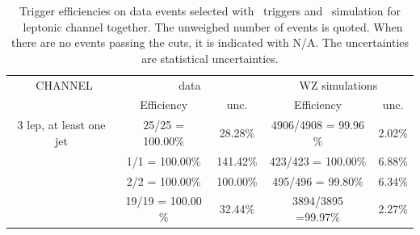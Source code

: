 \begin{table}[htbp]
	\centering
	\caption{Trigger efficiencies on data events selected with \Etmis\ triggers and \WZ\ simulation for \emumu\ leptonic channel together. The unweighed number of events is quoted. When there are no events passing the cuts, it is indicated with N/A. The uncertainties are statistical uncertainties.}

	\begin{tabular}{c|c|c|c|c}
		\toprule 
		\emumu\ CHANNEL & \multicolumn{2}{c|}{data} & \multicolumn{2}{c}{WZ simulations} \\ 
		& Efficiency & unc. & Efficiency & unc. \\
		\midrule
		3 lep,  at least one jet & 25/25 = 100.00\%  & 28.28\% & 4906/4908 = 99.96 \% & 2.02\%  \\ 
		\hline 
		\STSR & 1/1 = 100.00\% &141.42\% & 423/423 = 100.00\% & 6.88\% \\ 
		\hline 
		\TTSR & 2/2 = 100.00\% & 100.00\% & 495/496 = 99.80\% & 6.34\% \\ 
		\hline 
		\WZCR & 19/19 = 100.00 \% & 32.44\% & 3894/3895 =99.97\% & 2.27\% \\ 
		\bottomrule 
	\end{tabular} 
	\label{tab:trigSF}
\end{table}
